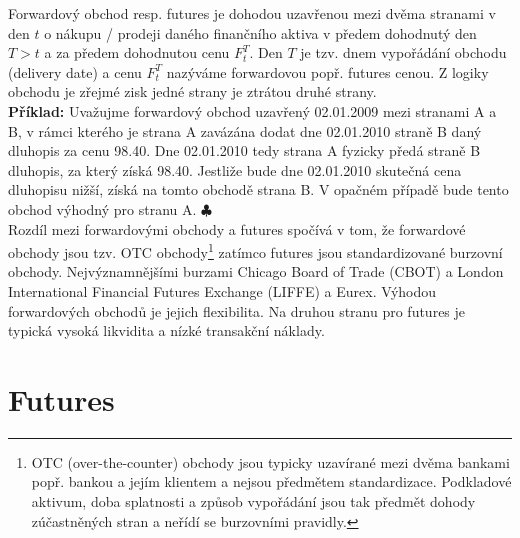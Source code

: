 \documentclass[a4paper]{book}
\begin{document}
Forwardový obchod resp. futures je dohodou uzavřenou mezi dvěma stranami v den $t$ o nákupu / prodeji daného finančního aktiva v předem dohodnutý den $T > t$ a za předem dohodnutou cenu $F_t^T$. Den $T$ je tzv. dnem vypořádání obchodu (delivery date) a cenu $F_t^T$ nazýváme forwardovou popř. futures cenou. Z logiky obchodu je zřejmé zisk jedné strany je ztrátou druhé strany.\\

\noindent \textbf{Příklad:} Uvažujme forwardový obchod uzavřený 02.01.2009 mezi stranami A a B, v rámci kterého je strana A zavázána dodat dne 02.01.2010 straně B daný dluhopis za cenu 98.40. Dne 02.01.2010 tedy strana A fyzicky předá straně B dluhopis, za který získá 98.40. Jestliže bude dne 02.01.2010 skutečná cena dluhopisu nižší, získá na tomto obchodě strana B. V opačném případě bude tento obchod výhodný pro stranu A. $\clubsuit$\\

Rozdíl mezi forwardovými obchody a futures spočívá v tom, že forwardové obchody jsou tzv. OTC obchody\footnote{OTC (over-the-counter) obchody jsou typicky uzavírané mezi dvěma bankami popř. bankou a jejím klientem a nejsou předmětem standardizace. Podkladové aktivum, doba splatnosti a způsob vypořádání jsou tak předmět dohody zúčastněných stran a neřídí se burzovními pravidly.} zatímco futures jsou standardizované burzovní obchody. Nejvýznamnějšími burzami Chicago Board of Trade (CBOT) a London International Financial Futures Exchange (LIFFE) a Eurex. Výhodou forwardových obchodů je jejich flexibilita. Na druhou stranu pro futures je typická vysoká likvidita a nízké transakční náklady.

\section{Futures}
\end{document}
